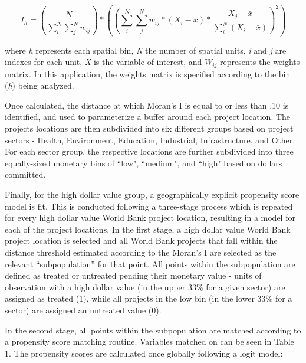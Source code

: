\documentclass{article}\usepackage[]{graphicx}\usepackage[]{color}
\newenvironment{knitrout}{}{}  %
\begin{document}
\begin{knitrout}
\begin{equation}
I_h = (\frac{N}{\sum_{i}^{N}\sum_{j}^{N}w_{ij}}) * ((\sum_{i}^{N}\sum_{j}^{N}w_{ij} * (X_{i}-\bar{x}) * \frac{X_{j} - \bar{x}}{\sum_{i}^{N}(X_{i}-\bar{x})})^{2})
\label{EQmoran}
\end{equation}

where \textit{h} represents each spatial bin, \textit{N} the number of spatial units, \textit{i} and \textit{j} are indexes for each unit, \textit{X} is the variable of interest, and \begin{math}W_{ij}\end{math} represents the weights matrix.  
In this application, the weights matrix is specified according to the bin (\textit{h}) being analyzed.  

\par
Once calculated, the distance at which Moran's I is equal to or less than .10 is identified, and used to parameterize a buffer around each project location. 
The projects locations are then subdivided into six different groups based on project sectors - Health, Environment, Education, Industrial, Infrastructure, and Other. 
For each sector group, the respective locations are further subdivided into three equally-sized monetary bins of ``low", ``medium", and ``high" based on dollars committed.

\par

Finally, for the high dollar value group, a geographically explicit propensity score model is fit.  
This is conducted following a three-stage process which is repeated for every high dollar value World Bank project location, resulting in a model for each of the project locations.
In the first stage, a high dollar value World Bank project location is selected and all World Bank projects that fall within the distance threshold estimated according to the Moran's I are selected as the relevant ``subpopulation'' for that point.
All points within the subpopulation are defined as treated or untreated pending their monetary value - units of observation with a high dollar value (in the upper 33\% for a given sector) are assigned as treated (1), while all projects in the  low bin (in the lower 33\% for a sector) are assigned an untreated value (0).

\par
In the second stage, all points within the subpopulation are matched according to a propensity score matching routine.  
Variables matched on can be seen in Table 1. 
The propensity scores are calculated once globally following a logit model:


\end{knitrout}
\end{document}
